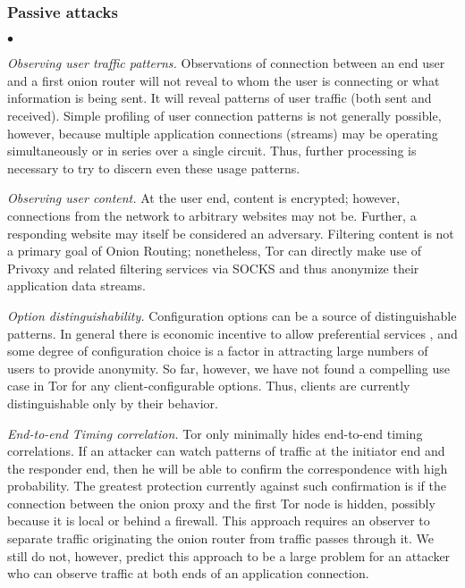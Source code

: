 \documentclass[times,10pt,twocolumn]{article}
\newenvironment{tightlist}{\begin{list}{$\bullet$}{
  \setlength{\itemsep}{0mm}
    \setlength{\parsep}{0mm}
    }}{\end{list}}
\begin{document}
\subsubsection*{Passive attacks}
\begin{tightlist}
\item \emph{Observing user traffic patterns.} Observations of connection
  between an end user and a first onion router will not reveal to whom
  the user is connecting or what information is being sent. It will
  reveal patterns of user traffic (both sent and received). Simple
  profiling of user connection patterns is not generally possible,
  however, because multiple application connections (streams) may be
  operating simultaneously or in series over a single circuit. Thus,
  further processing is necessary to try to discern even these usage
  patterns.
  
\item \emph{Observing user content.} At the user end, content is
  encrypted; however, connections from the network to arbitrary
  websites may not be. Further, a responding website may itself be
  considered an adversary. Filtering content is not a primary goal of
  Onion Routing; nonetheless, Tor can directly make use of Privoxy and
  related filtering services via SOCKS and thus anonymize their
  application data streams.

\item \emph{Option distinguishability.} Configuration options can be a
  source of distinguishable patterns. In general there is economic
  incentive to allow preferential services \cite{econymics}, and some
  degree of configuration choice is a factor in attracting large
  numbers of users to provide anonymity.  So far, however, we have
  not found a compelling use case in Tor for any client-configurable
  options.  Thus, clients are currently distinguishable only by their
  behavior.
  
\item \emph{End-to-end Timing correlation.}  Tor only minimally hides
  end-to-end timing correlations. If an attacker can watch patterns of
  traffic at the initiator end and the responder end, then he will be
  able to confirm the correspondence with high probability. The
  greatest protection currently against such confirmation is if the
  connection between the onion proxy and the first Tor node is hidden,
  possibly because it is local or behind a firewall.  This approach
  requires an observer to separate traffic originating the onion
  router from traffic passes through it.  We still do not, however,
  predict this approach to be a large problem for an attacker who can
  observe traffic at both ends of an application connection.
  

\end{tightlist}
\end{document}
